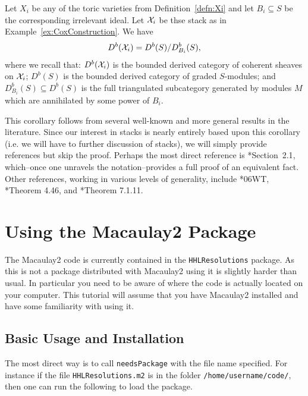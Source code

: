 \documentclass{amsart}
\begin{document}
\begin{cor}\label{cor:stacksAndDb}
  Let $X_i$ be any of the toric varieties from Definition~\ref{defn:Xi} and let $B_i\subseteq S$ be the corresponding irrelevant ideal.  Let $\mathcal X_i$ be thse stack as in Example~\ref{ex:CoxConstruction}.  We have
  \[
  D^b(\mathcal X_i) = D^b(S) / D^b_{B_i}(S),
  \]
  where we recall that: $D^b(\mathcal X_i)$ is the bounded derived category of coherent sheaves on $\mathcal X_i$; $D^b(S)$ is the bounded derived category of graded $S$-modules; and $D^b_{B_i}(S)\subseteq D^b(S)$ is the full triangulated subcategory generated by modules $M$ which are annihilated by some power of $B_i$.
\end{cor}
This corollary follows from several well-known and more general results in the literature.  Since our interest in stacks is nearly entirely based upon this corollary (i.e. we will have to further discussion of stacks), we will simply provide references but skip the proof.  Perhaps the most direct reference is \cite{AOV2008}*{Section~2.1}, which--once one unravels the notation--provides a full proof of an equivalent fact.  Other references, working in various levels of generality, include  \cite{stacks-project}*{06WT}, \cite{vistoli}*{Theorem 4.46}, and  \cite{alper}*{Theorem 7.1.11}. 

\section{Using the Macaulay2 Package}

The Macaulay2 code is currently contained in the \texttt{HHLResolutions} package. As this is not a package distributed with Macaulay2 using it is slightly harder than usual. In particular you need to be aware of where the code is actually located on your computer. This tutorial will assume that you have Macaulay2 installed and have some familiarity with using it. 

\subsection{Basic Usage and Installation}
The most direct way is to call \verb|needsPackage| with the file name specified. For instance if the file \verb|HHLResolutions.m2| is in the folder \verb|/home/username/code/|, then one can run the following to load the package.
\end{document}
